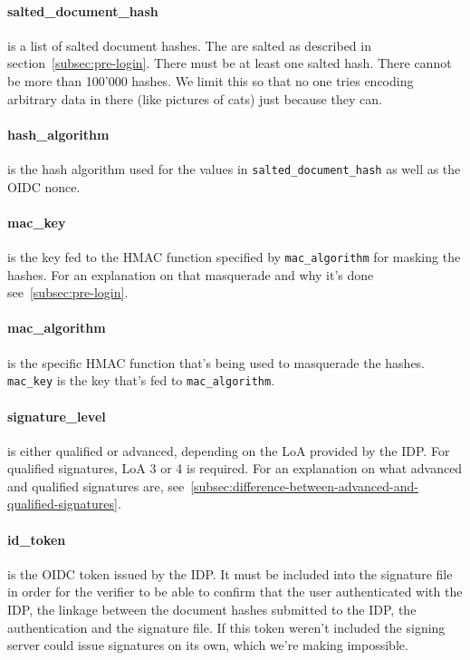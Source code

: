 \paragraph{salted\_document\_hash} is a list of salted document hashes.
The are salted as described in section~\ref{subsec:pre-login}.
There must be at least one salted hash.
There cannot be more than 100'000 hashes.
We limit this so that no one tries encoding arbitrary data in there (like pictures of cats) just because they can.

\paragraph{hash\_algorithm} is the hash algorithm used for the values in \texttt{salted\_document\_hash} as well as the \gls{OIDC} nonce.
\paragraph{mac\_key} is the key fed to the \gls{HMAC} function specified by \texttt{mac\_algorithm} for masking the hashes.
For an explanation on that masquerade and why it's done see~\ref{subsec:pre-login}.
\paragraph{mac\_algorithm} is the specific \gls{HMAC} function that's being used to masquerade the hashes.
\texttt{mac\_key} is the key that's fed to \texttt{mac\_algorithm}.
\paragraph{signature\_level} is either qualified or advanced, depending on the \gls{LoA} provided by the \gls{IDP}.
For qualified signatures, \gls{LoA} 3 or 4 is required.
For an explanation on what advanced and qualified signatures are, see~\ref{subsec:difference-between-advanced-and-qualified-signatures}.
\paragraph{id\_token} is the \gls{OIDC} token issued by the \gls{IDP}.
It must be included into the signature file in order for the verifier to be able to confirm that the user authenticated with the \gls{IDP},
the linkage between the document hashes submitted to the \gls{IDP}, the authentication and the signature file.
If this token weren't included the signing server could issue signatures on its own, which we're making impossible.
